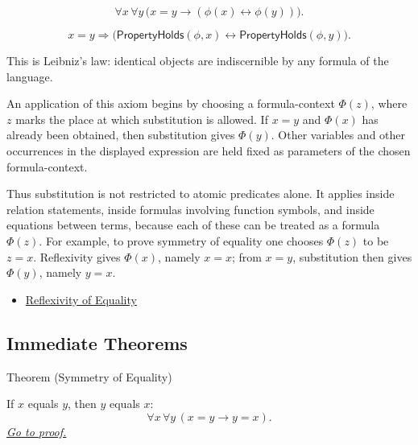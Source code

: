 \begin{remark*}
\[
  \forall x\,\forall y\,
  \bigl(x=y\to(\phi(x)\leftrightarrow\phi(y))\bigr).
\]
\end{remark*}

\begin{remark*}
\[
  x=y
  \Longrightarrow
  \bigl(\mathsf{PropertyHolds}(\phi,x)
  \leftrightarrow
  \mathsf{PropertyHolds}(\phi,y)\bigr).
\]
\end{remark*}

\begin{remark*}[Interpretation]
This is Leibniz's law: identical objects are indiscernible by any formula of
the language.

An application of this axiom begins by choosing a formula-context
\(\Phi(z)\), where \(z\) marks the place at which substitution is allowed.
If \(x=y\) and \(\Phi(x)\) has already been obtained, then substitution gives
\(\Phi(y)\). Other variables and other occurrences in the displayed expression
are held fixed as parameters of the chosen formula-context.

Thus substitution is not restricted to atomic predicates alone. It applies
inside relation statements, inside formulas involving function symbols, and
inside equations between terms, because each of these can be treated as a
formula \(\Phi(z)\). For example, to prove symmetry of equality one chooses
\(\Phi(z)\) to be \(z=x\). Reflexivity gives \(\Phi(x)\), namely \(x=x\);
from \(x=y\), substitution then gives \(\Phi(y)\), namely \(y=x\).
\end{remark*}


\begin{dependencies}
\begin{itemize}
  \item \hyperref[ax:axiomatic-equality-reflexivity]{Reflexivity of Equality}
\end{itemize}
\end{dependencies}

\subsection{Immediate Theorems}

\begin{theorembox}{Theorem (Symmetry of Equality)}
\begin{theorem}\label{thm:axiomatic-equality-symmetry}
If \(x\) equals \(y\), then \(y\) equals \(x\):
\[
  \forall x\,\forall y\,(x=y\to y=x).
\]
\hyperref[prf:axiomatic-equality-symmetry]{\textit{Go to proof.}}
\end{theorem}
\end{theorembox}

